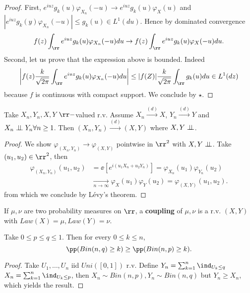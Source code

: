\documentclass[../main.tex]{subfiles}
\begin{document}
\begin{proof}
  First, $e^{iuz} g_k(u) \varphi_{X_n}(-u) \to e^{iuz} g_k(u) \varphi_{X}(u)$
  and $|e^{iuz} g_k(y) \varphi_{X_n}(-u)| \leq g_k(u) \in L^1(du)$. Hence by
  dominated convergence
  \[
    f(z) \int_{\rr}e^{iuz} g_k(u) \varphi_{X_n}(-u)du \to 
    f(z) \int_{\rr}e^{iuz} g_k(u) \varphi_{X}(-u)du
  .\] 
  Second, let us prove that the expression above is bounded. Indeed
  \[
    \left| f(z) \frac{k}{\sqrt{2\pi}} \int_{\rr} e^{iuz} g_k(u)
    \varphi_{X_n}(-u) du \right|  \leq |f(Z)| \frac{k}{\sqrt{2\pi}} \int_{\rr}
    g_k(u)du \in L^1(dz)
  \]
  because $f$ is continuous with compact support. We conclude by $\star$.
\end{proof}
\begin{application}
  Take $X_n, Y_n, X, Y$ $\rr-$valued r.v. Assume $X_n
  \overset{(d)}{\longrightarrow} X$, $Y_n \overset{(d)}{\longrightarrow} Y$ and
  $X_n \perp\!\!\!\!\,\perp Y_n \forall n \geq 1$. Then $(X_n, Y_n)
  \overset{(d)}{\longrightarrow} (X, Y)$ where $X, Y \perp\!\!\!\!\,\perp$.
\end{application}
\begin{proof}
  We show $\varphi_{(X_n, Y_n)} \to \varphi_{(X, Y)}$ pointwise in $\rr^2$ with
  $X, Y \perp\!\!\!\!\,\perp$. Take
  $(u_1, u_2) \in \rr^2$, then
  \begin{align*}
    \varphi_{(X_n, Y_n)}(u_1, u_2) &= \ee[ e^{i(u_1X_n + u_2 Y_n)}] 
    = \varphi_{X_n}(u_1) \varphi_{Y_n}(u_2) \\
    &\underset{n \to \infty}{\longrightarrow} \varphi_{X}(u_1) \varphi_{Y}(u_2)
    = \varphi_{(X, Y)}(u_1, u_2)
  .\end{align*} 
  from which we conclude by Lévy's theorem. 
\end{proof}

\begin{remark}
  If $\mu, \nu$ are two probability measures on $\rr$, a \textbf{coupling}
  of $\mu, \nu$ is a r.v. $(X, Y)$ with $Law(X) = \mu, Law(Y) = \nu$.
\end{remark}
\begin{application}
    Take $0 \leq p \leq q \leq 1$. Then for every $0 \leq k \leq n$,
    \[
      \pp(Bin(n, q) \geq k) \geq \pp(Bin(n, p) \geq k)
    .\] 
\end{application}
\begin{proof}
  Take $U_1, \ldots, U_n$ iid $Uni([0, 1])$ r.v. Define $Y_n = \sum_{k=1}^n
  \ind_{U_k \leq q}$
  $X_n = \sum_{k=1}^n
  \ind_{U_k \leq p}$, then $X_n \sim Bin(n, p), Y_n \sim Bin(n, q)$ but $Y_n
  \geq X_n$, which yields the result.
\end{proof}
\end{document}
